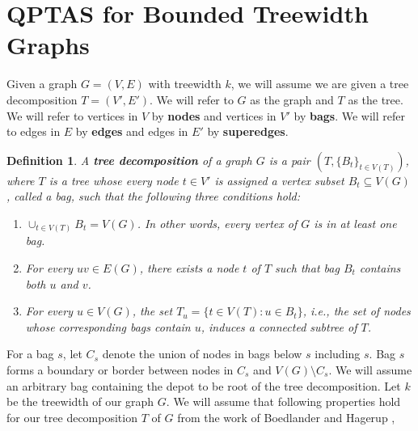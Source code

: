 \documentclass[twoside,leqno]{article}
\newtheorem{definition}{Definition}
\begin{document}
\section{QPTAS for Bounded Treewidth Graphs}
Given a graph $G = (V,E)$ with treewidth $k$, we will assume we are given a tree decomposition $T = (V',E')$. We will refer to $G$ as the graph and $T$ as the tree. We will refer to vertices in $V$ by \textbf{nodes} and vertices in $V'$ by \textbf{bags}. We will refer to edges in $E$ by \textbf{edges} and edges in $E'$ by \textbf{superedges}.
\begin{definition}
A \textbf{tree decomposition} of a graph $G$ is a pair $(T, \{B_t\}_{t \in V(T)})$, where $T$ is a tree whose every node $t \in V'$ is assigned a vertex subset $B_t \subseteq V(G)$, called a bag, such that the following three conditions hold: 
\begin{enumerate}
    \item $\cup_{t \in V(T)} B_t = V(G)$. In other words, every vertex of $G$ is in at least one bag. 
    \item For every $uv \in E(G)$, there exists a node $t$ of $T$ such that bag $B_t$ contains both $u$ and $v$. 
    \item For every $u \in V(G)$, the set $T_u = \{t \in V(T) : u \in B_t \}$, i.e., the set of nodes whose corresponding bags contain $u$, induces a connected subtree of $T$. 
\end{enumerate}
\end{definition} 
For a bag $s$, let $C_s$ denote the union of nodes in bags below $s$ including $s$. Bag $s$ forms a boundary or border between nodes in $C_s$ and $V(G) \setminus C_s$. We will assume an arbitrary bag containing the depot to be root of the tree decomposition. Let $k$ be the treewidth of our graph $G$. We will assume that following properties hold for our tree decomposition $T$ of $G$ from the work of Boedlander and Hagerup \cite{BodlaenderH95}, 
\end{document}
